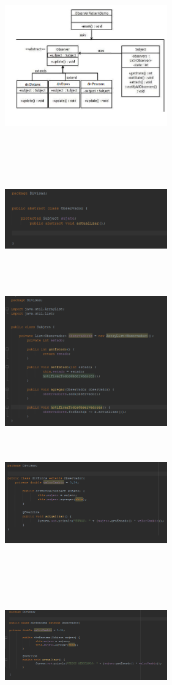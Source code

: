 \documentclass[twoside,twocolumn]{article}
\begin{document}
 \includegraphics[width=7cm, height=7cm]{imagenes/observerEj.png}
 \includegraphics[width=7cm, height=6cm]{imagenes/eje1.png}
 \includegraphics[width=7cm, height=6cm]{imagenes/eje2.png}
 \includegraphics[width=7cm, height=6cm]{imagenes/eje3.png}
 \includegraphics[width=7cm, height=6cm]{imagenes/eje4.png}
\end{document}
